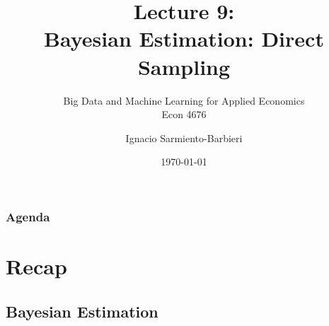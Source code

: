 \documentclass[
  shownotes,
  xcolor={svgnames},
  hyperref={colorlinks,citecolor=DarkBlue,linkcolor=DarkRed,urlcolor=DarkBlue}
  , aspectratio=169]{beamer}
\begin{document}
\title[Lecture 9]{Lecture 9: \\  Bayesian Estimation: Direct Sampling}
\subtitle{Big Data and Machine Learning for Applied Economics \\ Econ 4676}
\date{\today}

\author[Sarmiento-Barbieri]{Ignacio Sarmiento-Barbieri}


\begin{frame}[noframenumbering]
\maketitle
\end{frame}





\begin{frame}
\frametitle{Agenda}

\tableofcontents


\end{frame}
\section{Recap}
\subsection{Bayesian Estimation}
\end{document}
